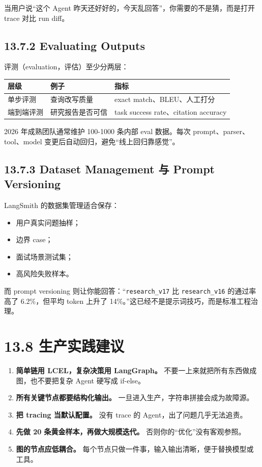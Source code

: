 当用户说``这个 Agent 昨天还好好的，今天乱回答''，你需要的不是猜，而是打开 trace 对比 run diff。


\subsection{13.7.2 Evaluating Outputs}

评测（evaluation，评估）至少分两层：


\begingroup
\scriptsize
\setlength{\tabcolsep}{3pt}
\begin{longtable}{|p{}|p{}|p{}|}
\hline
层级 & 例子 & 指标 \\ \hline
单步评测 & 查询改写质量 & exact match、BLEU、人工打分 \\ \hline
端到端评测 & 研究报告是否可信 & task success rate、citation accuracy \\ \hline
\end{longtable}
\endgroup

2026 年成熟团队通常维护 100-1000 条内部 eval 数据。每次 prompt、parser、tool、model 变更后自动回归，避免``线上回归靠感觉''。


\subsection{13.7.3 Dataset Management 与 Prompt Versioning}

LangSmith 的数据集管理适合保存：


\begin{itemize}[leftmargin=2em]
\item 用户真实问题抽样；
\item 边界 case；
\item 面试场景测试集；
\item 高风险失败样本。
\end{itemize}

而 prompt versioning 则让你能回答：``\texttt{research\_v17} 比 \texttt{research\_v16} 的通过率高了 6.2\%，但平均 token 上升了 14\%。''这已经不是提示词技巧，而是标准工程治理。


\section{13.8 生产实践建议}

\begin{enumerate}[leftmargin=2em]
\item \textbf{简单链用 LCEL，复杂决策用 LangGraph。} 不要一上来就把所有东西做成图，也不要把复杂 Agent 硬写成 if-else。
\item \textbf{所有关键节点都要结构化输出。} 一旦进入生产，字符串拼接会成为故障源。
\item \textbf{把 tracing 当默认配置。} 没有 trace 的 Agent，出了问题几乎无法追责。
\item \textbf{先做 20 条黄金样本，再做大规模迭代。} 否则你的``优化''没有客观参照。
\item \textbf{图的节点应低耦合。} 每个节点只做一件事，输入输出清晰，便于替换模型或工具。
\end{enumerate}

